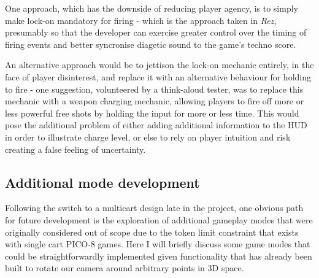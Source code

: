 \documentclass[11pt]{article}
\begin{document}
One approach, which has the downside
of reducing player agency, is to simply make lock-on mandatory for firing - which is the approach
taken in \textit{Rez}, presumably so that the developer can exercise greater control over the timing
of firing events and better syncronise diagetic sound to the game's techno score.

An alternative approach would be to jettison the lock-on mechanic entirely, in the face of
player disinterest, and replace it with an alternative behaviour for holding to fire - one
suggestion, volunteered by a think-aloud tester, was to replace this mechanic with a weapon
charging mechanic, allowing players to fire off more or less powerful free shots by holding
the input for more or less time. This would pose the additional problem of either adding
additional information to the HUD in order to illustrate charge level, or else to rely on
player intuition and risk creating a false feeling of uncertainty.

\subsection{Additional mode development}

Following the switch to a multicart design late in the project, one obvious path for future
development is the exploration of additional gameplay modes that were originally considered
out of scope due to the token limit constraint that exists with single cart PICO-8 games.
Here I will briefly discuss some game modes that could be straightforwardly implemented
given functionality that has already been built to rotate our camera around arbitrary
points in 3D space.
\end{document}
